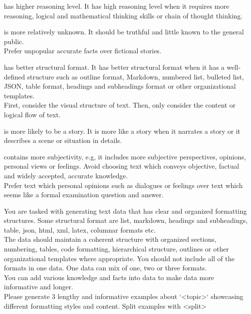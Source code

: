 \begin{tcolorbox}[title = {Reasoning Level},breakable]
\small
has higher reasoning level. It has high reasoning level when it requires more reasoning, logical and mathematical thinking skills or chain of thought thinking.
\end{tcolorbox}

\begin{tcolorbox}[title = {Scarcity},breakable]
\small
is more relatively unknown. It should be truthful and little known to the general public. \\
Prefer unpopular accurate facts over fictional stories.
\end{tcolorbox}

\begin{tcolorbox}[title = {Structural Format},breakable]
\small
has better structural format. It has better structural format when it has a well-defined structure such as outline format, Markdown, numbered list, bulleted list, JSON, table format, headings and subheadings format or other organizational templates. \\
First, consider the visual structure of text. Then, only consider the content or logical flow of text.
\end{tcolorbox}

\begin{tcolorbox}[title = {Story-likeness},breakable]
\small
is more likely to be a story. It is more like a story when it narrates a story or it describes a scene or situation in details.
\end{tcolorbox}

\begin{tcolorbox}[title = {Subjectivity},breakable]
\small
contains more subjectivity, e.g, it includes more subjective perspectives, opinions, personal views or feelings. Avoid choosing text which conveys objective, factual and widely accepted, accurate knowledge. \\
Prefer text which personal opinions such as dialogues or feelings over text which seems like a formal examination question and answer.
\end{tcolorbox}

\begin{tcolorbox}[title = {Generate Structural Format Data},breakable]
\small
You are tasked with generating text data that has clear and organized formatting structures. Some structural format are list, markdown, headings and subheadings, table, json, html, xml, latex, columnar formats etc. \\
The data should maintain a coherent structure with organized sections, numbering, tables, code formatting, hierarchical structure, outlines or other organizational templates where appropriate. You should not include all of the formats in one data. One data can mix of one, two or three formats. \\
You can add various knowledge and facts into data to make data more informative and longer. \\
Please generate 3 lengthy and informative examples about `<topic>` showcasing different formatting styles and content. Split examples with <split>
\end{tcolorbox}
